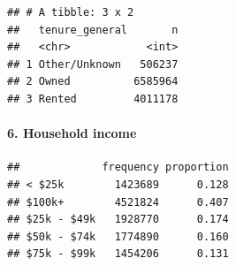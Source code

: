 \documentclass[
]{article}
\newenvironment{Shaded}{\begin{snugshade}}{\end{snugshade}}
\newcommand{\AttributeTok}[1]{\textcolor[rgb]{0.13,0.29,0.53}{#1}}
\newcommand{\CommentTok}[1]{\textcolor[rgb]{0.56,0.35,0.01}{\textit{#1}}}
\newcommand{\ConstantTok}[1]{\textcolor[rgb]{0.56,0.35,0.01}{#1}}
\newcommand{\DecValTok}[1]{\textcolor[rgb]{0.00,0.00,0.81}{#1}}
\newcommand{\FunctionTok}[1]{\textcolor[rgb]{0.13,0.29,0.53}{\textbf{#1}}}
\newcommand{\NormalTok}[1]{#1}
\newcommand{\OtherTok}[1]{\textcolor[rgb]{0.56,0.35,0.01}{#1}}
\newcommand{\SpecialCharTok}[1]{\textcolor[rgb]{0.81,0.36,0.00}{\textbf{#1}}}
\newcommand{\StringTok}[1]{\textcolor[rgb]{0.31,0.60,0.02}{#1}}
\begin{document}
\begin{verbatim}
## # A tibble: 3 x 2
##   tenure_general       n
##   <chr>            <int>
## 1 Other/Unknown   506237
## 2 Owned          6585964
## 3 Rented         4011178
\end{verbatim}

\paragraph{6. Household income}\label{household-income}

\begin{Shaded}
\end{Shaded}

\begin{verbatim}
##             frequency proportion
## < $25k        1423689      0.128
## $100k+        4521824      0.407
## $25k - $49k   1928770      0.174
## $50k - $74k   1774890      0.160
## $75k - $99k   1454206      0.131
\end{verbatim}
\end{document}
